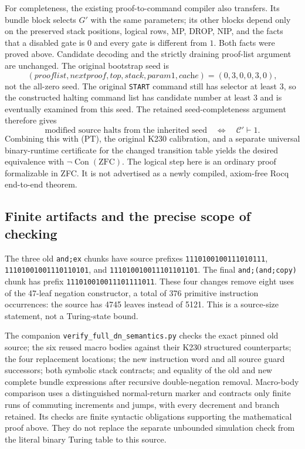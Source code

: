 For completeness, the existing proof-to-command compiler also
transfers.  Its bundle block selects $G'$ with the same parameters;
its other blocks depend only on the preserved stack positions,
logical rows, MP, DROP, NIP, and the facts that a disabled gate is
$0$ and every gate is different from $1$.  Both facts were proved
above.  Candidate decoding and the strictly draining proof-list
argument are unchanged.  The original bootstrap seed is
\[
 (\textit{prooflist},\textit{nextproof},\textit{top},
   \textit{stack},\textit{param1},\textit{cache})
       =(0,3,0,0,3,0),
\]
not the all-zero seed.  The original \texttt{START} command still
has selector at least $3$, so the constructed halting command list
has candidate number at least $3$ and is eventually examined from
this seed.  The retained seed-completeness argument therefore gives
\[
 \text{modified source halts from the inherited seed}
 \quad\Longleftrightarrow\quad \mathcal C'\vdash1.
\]
Combining this with (PT), the original K230 calibration, and a
separate universal binary-runtime certificate for the changed
transition table yields the desired equivalence with
$\neg\operatorname{Con}(\mathrm{ZFC})$.  The logical step here
is an ordinary proof formalizable in ZFC.  It is not advertised as
a newly compiled, axiom-free Rocq end-to-end theorem.

\subsection{Finite artifacts and the precise scope of checking}

The three old \texttt{and;ex} chunks have source prefixes
\texttt{1110100100111010111},
\texttt{11101001001110110101}, and
\texttt{111010010011101101101}.  The final
\texttt{and;(and;copy)} chunk has prefix
\texttt{111010010011101111011}.  These four changes remove eight
uses of the 47-leaf negation constructor, a total of 376 primitive
instruction occurrences: the source has 4745 leaves instead of 5121.
This is a source-size statement, not a Turing-state bound.

The companion \texttt{verify\_full\_dn\_semantics.py} checks the
exact pinned old source; the six reused macro bodies against their
K230 structured counterparts; the four replacement locations; the
new instruction word and all source guard successors; both symbolic
stack contracts; and equality of the old and new complete bundle
expressions after recursive double-negation removal.  Macro-body
comparison uses a distinguished normal-return marker and contracts
only finite runs of commuting increments and jumps, with every
decrement and branch retained.  Its checks are finite syntactic
obligations supporting the mathematical proof above.  They do not
replace the separate unbounded simulation check from the literal
binary Turing table to this source.
